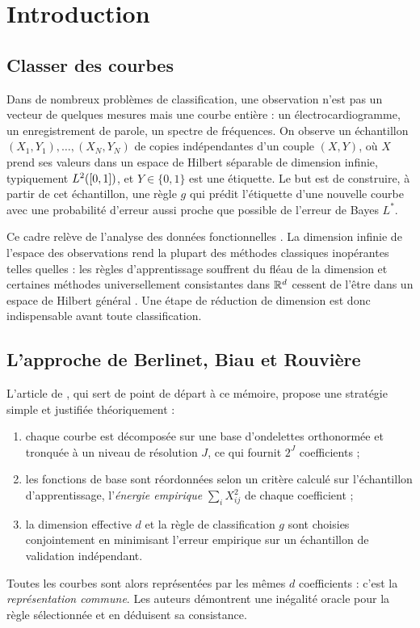 \chapter{Introduction}\label{chap-intro}

\section{Classer des courbes}

Dans de nombreux problèmes de classification, une observation n'est pas un vecteur de quelques mesures mais une courbe entière : un électrocardiogramme, un enregistrement de parole, un spectre de fréquences. On observe un échantillon $(X_1,Y_1),\dots,(X_N,Y_N)$ de copies indépendantes d'un couple $(X,Y)$, où $X$ prend ses valeurs dans un espace de Hilbert séparable de dimension infinie, typiquement $L^2([0,1])$, et $Y\in\{0,1\}$ est une étiquette. Le but est de construire, à partir de cet échantillon, une règle $g$ qui prédit l'étiquette d'une nouvelle courbe avec une probabilité d'erreur aussi proche que possible de l'erreur de Bayes $L^*$.

Ce cadre relève de l'analyse des données fonctionnelles \citep{ramsay2005functional,ferraty2006nonparametric}. La dimension infinie de l'espace des observations rend la plupart des méthodes classiques inopérantes telles quelles : les règles d'apprentissage souffrent du fléau de la dimension et certaines méthodes universellement consistantes dans $\mathbb{R}^d$ cessent de l'être dans un espace de Hilbert général \citep{abraham2006kernel,cerou2006nearest}. Une étape de réduction de dimension est donc indispensable avant toute classification.

\section{L'approche de Berlinet, Biau et Rouvière}

L'article de \citet{berlinet2008functional}, qui sert de point de départ à ce mémoire, propose une stratégie simple et justifiée théoriquement :
\begin{enumerate}
  \item chaque courbe est décomposée sur une base d'ondelettes orthonormée et tronquée à un niveau de résolution $J$, ce qui fournit $2^J$ coefficients ;
  \item les fonctions de base sont réordonnées selon un critère calculé sur l'échantillon d'apprentissage, l'\emph{énergie empirique} $\sum_i X_{ij}^2$ de chaque coefficient ;
  \item la dimension effective $d$ et la règle de classification $g$ sont choisies conjointement en minimisant l'erreur empirique sur un échantillon de validation indépendant.
\end{enumerate}
Toutes les courbes sont alors représentées par les mêmes $d$ coefficients : c'est la \emph{représentation commune}. Les auteurs démontrent une inégalité oracle pour la règle sélectionnée et en déduisent sa consistance.

